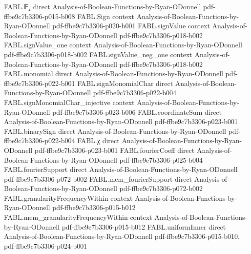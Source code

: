 \begin{theorem}
\label{FABL.hasDepthCircuit_parity_depth_three}
\leanok
{}
\proofstep
  {FABL.𝔽₂}
  {direct}
  {Analysis-of-Boolean-Functions-by-Ryan-ODonnell}
  {pdf-ffbe9c7b3306-p015-b008}
\proofstep
  {FABL.Sign}
  {context}
  {Analysis-of-Boolean-Functions-by-Ryan-ODonnell}
  {pdf-ffbe9c7b3306-p020-b001}
\proofstep
  {FABL.signValue}
  {context}
  {Analysis-of-Boolean-Functions-by-Ryan-ODonnell}
  {pdf-ffbe9c7b3306-p018-b002}
\proofstep
  {FABL.signValue_one}
  {context}
  {Analysis-of-Boolean-Functions-by-Ryan-ODonnell}
  {pdf-ffbe9c7b3306-p018-b002}
\proofstep
  {FABL.signValue_neg_one}
  {context}
  {Analysis-of-Boolean-Functions-by-Ryan-ODonnell}
  {pdf-ffbe9c7b3306-p018-b002}
\proofstep
  {FABL.monomial}
  {direct}
  {Analysis-of-Boolean-Functions-by-Ryan-ODonnell}
  {pdf-ffbe9c7b3306-p022-b001}
\proofstep
  {FABL.signMonomialChar}
  {direct}
  {Analysis-of-Boolean-Functions-by-Ryan-ODonnell}
  {pdf-ffbe9c7b3306-p022-b004}
\proofstep
  {FABL.signMonomialChar_injective}
  {context}
  {Analysis-of-Boolean-Functions-by-Ryan-ODonnell}
  {pdf-ffbe9c7b3306-p023-b006}
\proofstep
  {FABL.coordinateSum}
  {direct}
  {Analysis-of-Boolean-Functions-by-Ryan-ODonnell}
  {pdf-ffbe9c7b3306-p023-b001}
\proofstep
  {FABL.binarySign}
  {direct}
  {Analysis-of-Boolean-Functions-by-Ryan-ODonnell}
  {pdf-ffbe9c7b3306-p022-b004}
\proofstep
  {FABL.χ}
  {direct}
  {Analysis-of-Boolean-Functions-by-Ryan-ODonnell}
  {pdf-ffbe9c7b3306-p023-b001}
\proofstep
  {FABL.fourierCoeff}
  {direct}
  {Analysis-of-Boolean-Functions-by-Ryan-ODonnell}
  {pdf-ffbe9c7b3306-p025-b004}
\proofstep
  {FABL.fourierSupport}
  {direct}
  {Analysis-of-Boolean-Functions-by-Ryan-ODonnell}
  {pdf-ffbe9c7b3306-p072-b002}
\proofstep
  {FABL.mem_fourierSupport}
  {direct}
  {Analysis-of-Boolean-Functions-by-Ryan-ODonnell}
  {pdf-ffbe9c7b3306-p072-b002}
\proofstep
  {FABL.granularityFrequencyWithin}
  {context}
  {Analysis-of-Boolean-Functions-by-Ryan-ODonnell}
  {pdf-ffbe9c7b3306-p015-b012}
\proofstep
  {FABL.mem_granularityFrequencyWithin}
  {context}
  {Analysis-of-Boolean-Functions-by-Ryan-ODonnell}
  {pdf-ffbe9c7b3306-p015-b012}
\proofstep
  {FABL.uniformInner}
  {direct}
  {Analysis-of-Boolean-Functions-by-Ryan-ODonnell}
  {pdf-ffbe9c7b3306-p015-b010,
    pdf-ffbe9c7b3306-p024-b001}

\end{theorem}

